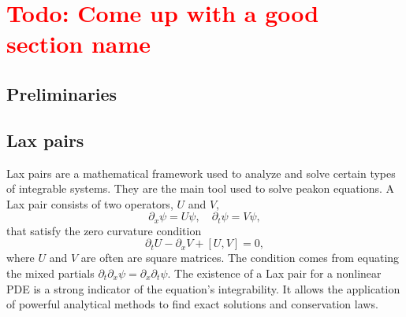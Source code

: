 \documentclass[english,master]{liumaiex}
\theoremstyle{plain}
\theoremstyle{definition}
\newcommand\todo[1]{\textcolor{red}{#1}}
\begin{document}
\section{\todo{Todo: Come up with a good section name}} \label{sec:ZeroCurvature}

\subsection{Preliminaries}
\subsection*{Lax pairs}

Lax pairs are a mathematical framework used to analyze and solve certain types of integrable systems. They are the main tool used to solve peakon equations. A Lax pair consists of two operators, $U$ and $V$,
\begin{equation}
	\partial_x \psi = U \psi, \quad \partial_t \psi = V \psi,
\end{equation}
that satisfy the zero curvature condition
\begin{equation}
	\partial_t U - \partial_x V + [U, V] = 0,
\end{equation}
where $U$ and $V$ are often are square matrices. The condition comes from equating the mixed partials $\partial_t \partial_x \psi = \partial_x \partial_t \psi$. The existence of a Lax pair for a nonlinear PDE is a strong indicator of the equation's integrability. It allows the application of powerful analytical methods to find exact solutions and conservation laws.
\end{document}
